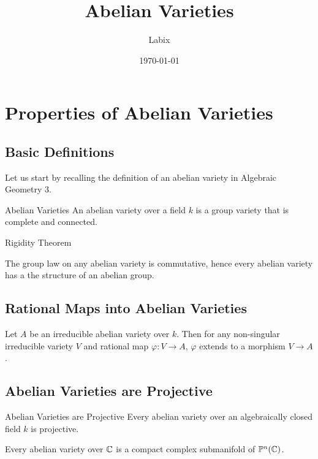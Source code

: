 \documentclass[a4paper]{article}
\title{Abelian Varieties}
\author{Labix}
\date{\today}
\begin{document}
\maketitle
\begin{abstract}
\begin{itemize}
\end{itemize}
\end{abstract}
\pagebreak
\tableofcontents

\pagebreak
\section{Properties of Abelian Varieties}
\subsection{Basic Definitions}
Let us start by recalling the definition of an abelian variety in Algebraic Geometry 3. 

\begin{defn}{Abelian Varieties}{} An abelian variety over a field $k$ is a group variety that is complete and connected. 
\end{defn}

\begin{thm}{Rigidity Theorem}{}
\end{thm}

\begin{crl}{}{} The group law on any abelian variety is commutative, hence every abelian variety has a the structure of an abelian group. 
\end{crl}

\subsection{Rational Maps into Abelian Varieties}
\begin{thm}{}{} Let $A$ be an irreducible abelian variety over $k$. Then for any non-singular irreducible variety $V$ and rational map $\varphi:V\to A$, $\varphi$ extends to a morphism $V\to A$. 
\end{thm}

\subsection{Abelian Varieties are Projective}
\begin{thm}{Abelian Varieties are Projective}{} Every abelian variety over an algebraically closed field $k$ is projective. 
\end{thm}

\begin{thm}{}{} Every abelian variety over $\mathbb{C}$ is a compact complex submanifold of $\mathbb{P}^n(\mathbb{C})$. 
\end{thm}
\end{document}

